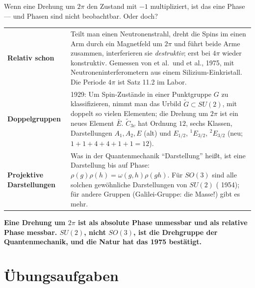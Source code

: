 \begin{warnung}
Wenn eine Drehung um $2\pi$ den Zustand mit $-1$ multipliziert, ist das eine Phase --- und Phasen sind nicht beobachtbar. Oder doch?

\begin{center}
{\small
\renewcommand{\arraystretch}{1.5}
\begin{tabular}{@{}P{3.2cm}P{5.4cm}@{}}
\toprule
\textbf{Relativ schon} & Teilt man einen Neutronenstrahl, dreht die Spins im einen Arm durch ein Magnetfeld um $2\pi$ und führt beide Arme zusammen, interferieren sie \emph{destruktiv}; erst bei $4\pi$ wieder konstruktiv. Gemessen von  et al.\ und  et al., 1975, mit Neutroneninterferometern aus einem Silizium-Einkristall. Die Periode $4\pi$ ist Satz 11.2 im Labor.\\
\textbf{Doppelgruppen} &  1929: Um Spin-Zustände in einer Punktgruppe $G$ zu klassifizieren, nimmt man das Urbild $\tilde G\subset SU(2)$, mit doppelt so vielen Elementen; die Drehung um $2\pi$ ist ein neues Element $\bar E$. $\tilde C_{3v}$ hat Ordnung $12$, sechs Klassen, Darstellungen $A_1, A_2, E$ (alt) und $E_{1/2}$, ${}^{1}E_{3/2}$, ${}^{2}E_{3/2}$ (neu; $1 + 1 + 4 + 4 + 1 + 1 = 12$).\\
\textbf{Projektive Darstellungen} & Was in der Quantenmechanik \enquote{Darstellung} heißt, ist eine Darstellung bis auf Phase: $\rho(g)\rho(h) = \omega(g, h)\rho(gh)$. Für $SO(3)$ sind alle solchen gewöhnliche Darstellungen von $SU(2)$ ( 1954); für andere Gruppen (Galilei-Gruppe: die Masse!) gibt es mehr.\\
\bottomrule
\end{tabular}}
\end{center}

\begin{center}
\begin{minipage}{0.9\textwidth}
\textbf{Eine Drehung um $2\pi$ ist als absolute Phase unmessbar und als relative Phase messbar. $SU(2)$, nicht $SO(3)$, ist die Drehgruppe der Quantenmechanik, und die Natur hat das 1975 bestätigt.}
\end{minipage}
\end{center}
\end{warnung}

\section{Übungsaufgaben}

